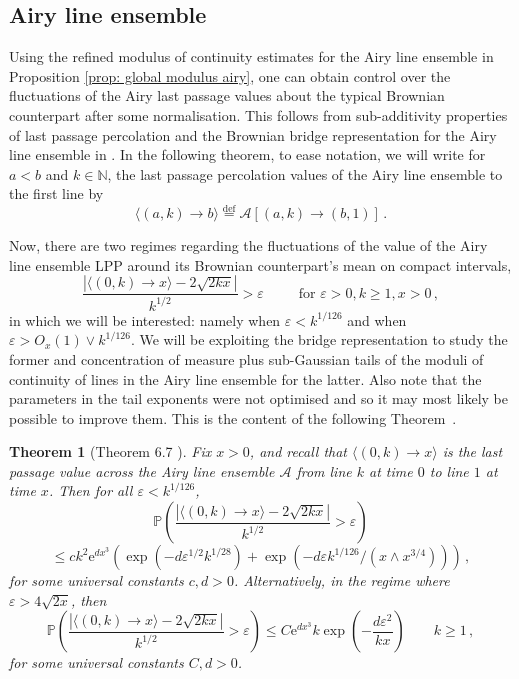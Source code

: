 \documentclass[11pt, reqno]{amsart}
\numberwithin{equation}{section}
\newcounter{dummy} \numberwithin{dummy}{section}
\newtheorem{theorem}[dummy]{Theorem}
\newcommand{\N}{\ensuremath{\mathbb{N}}}
\newcommand{\PP}{\ensuremath{\mathbb{P}}}
\begin{document}
\subsection{Airy line ensemble}\label{sec: Airy two point bounds}

Using the refined modulus of continuity estimates for the Airy line ensemble in Proposition \ref{prop: global modulus airy}, one can obtain control over the fluctuations of the Airy last passage values about the typical Brownian counterpart after some normalisation. This follows from sub-additivity properties of last passage percolation and the Brownian bridge representation for the Airy line ensemble in \cite{dauvergne2021}.
In the following theorem, to ease notation, we will write for $a<b$ and $k\in \N$, the last passage percolation values of the Airy line ensemble to the first line by 
\begin{equation}\label{eq: airy last passage values}
\langle (a,k)\to b \rangle \stackrel{\mathrm{def}}{=}\mathcal{A}[(a,k)\to (b,1)]\,.
\end{equation}

Now, there are two regimes regarding the fluctuations of the value of the Airy line ensemble LPP around its Brownian counterpart's mean on compact intervals,
\begin{equation*}
\frac{|\langle (0, k) \rightarrow x \rangle-{2\sqrt{2kx}}|}{k^{1/2}} > \varepsilon\,\qquad \mbox{ for }\varepsilon >0, k\ge 1, x>0\,,
\end{equation*}
 in which we will be interested: namely when $\varepsilon < k^{1/126}$ and when $\varepsilon > O_x(1)\lor k^{1/126}$. We will be exploiting the bridge representation to study the former and concentration of measure plus sub-Gaussian tails of the moduli of continuity of lines in the Airy line ensemble for the latter. Also note that the parameters in the tail exponents were not optimised and so it may most likely be possible to improve them. This is the content of the following Theorem~.

\begin{theorem}[Theorem 6.7 \cite{DOV}]\label{thm: Airy LPP deviation}
Fix $x>0$, and recall that $\langle (0, k) \rightarrow x \rangle$ is the last passage value across the Airy line ensemble $\mathcal{A}$ from line $k$ at time $0$ to line $1$ at time $x$. Then for all $\varepsilon < k ^{1/126}$,
$$
\PP \left(\frac{|\langle (0, k) \rightarrow x \rangle-{2\sqrt{2kx}}|}{k^{1/2}} > \varepsilon\right)$$
$$
\le c k^2 \mathrm{e}^{dx^3}\left(\exp(-d\varepsilon^{1/2}  k^{1/28}) + \exp\left(-d\varepsilon k^{1/126}/(x\land x^{3/4})\right)\right)\,,
$$
for some universal constants $c,d>0$. Alternatively, in the regime where $\varepsilon > 4\sqrt{2x}$, then
$$
\PP \left(\frac{|\langle (0, k) \rightarrow x \rangle-{2\sqrt{2kx}}|}{k^{1/2}} > \varepsilon\right) \le C \mathrm{e}^{dx^3} k\exp \left(-\frac{d\varepsilon^2}{kx}\right) \qquad k\ge 1\,,
$$
for some universal constants $C, d>0$.
\end{theorem}
\end{document}
